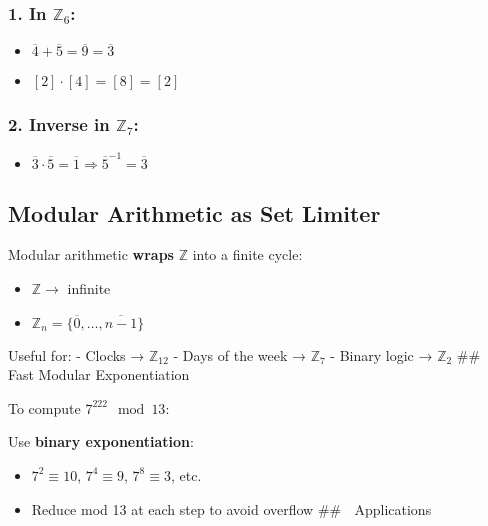 \documentclass[
]{article}
\providecommand{\tightlist}{%
  \setlength{\itemsep}{0pt}\setlength{\parskip}{0pt}}
\begin{document}
\subsubsection{\texorpdfstring{1. In
\(\mathbb{Z}_6\):}{1. In \textbackslash mathbb\{Z\}\_6:}}\label{in-mathbbz_6}

\begin{itemize}
\tightlist
\item
  \(\overline{4} + \overline{5} = \overline{9} = \overline{3}\)
\item
  \([2] \cdot [4] = [8] = [2]\)
\end{itemize}

\subsubsection{\texorpdfstring{2. Inverse in
\(\mathbb{Z}_7\):}{2. Inverse in \textbackslash mathbb\{Z\}\_7:}}\label{inverse-in-mathbbz_7}

\begin{itemize}
\tightlist
\item
  \(\overline{3} \cdot \overline{5} = \overline{1} \Rightarrow \overline{5}^{-1} = \overline{3}\)
\end{itemize}

\subsection{Modular Arithmetic as Set
Limiter}\label{modular-arithmetic-as-set-limiter}

Modular arithmetic \textbf{wraps} \(\mathbb{Z}\) into a finite cycle:

\begin{itemize}
\tightlist
\item
  \(\mathbb{Z} \to\) infinite
\item
  \(\mathbb{Z}_n = \{ \overline{0}, \dots, \overline{n-1} \}\)
\end{itemize}

Useful for: - Clocks → \(\mathbb{Z}_{12}\) - Days of the week →
\(\mathbb{Z}_7\) - Binary logic → \(\mathbb{Z}_2\) \#\# 🚀 Fast Modular
Exponentiation

To compute \(7^{222} \mod 13\):

Use \textbf{binary exponentiation}:

\begin{itemize}
\tightlist
\item
  \(7^2 \equiv 10\), \(7^4 \equiv 9\), \(7^8 \equiv 3\), etc.
\item
  Reduce mod 13 at each step to avoid overflow \#\# 🧰 Applications
\end{itemize}
\end{document}
